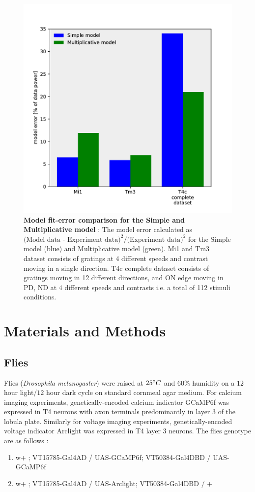 \documentclass[9pt,lineno]{elife}
\begin{document}
\begin{figure}
\begin{fullwidth}
\includegraphics[width=0.84\linewidth]{figure10}
\caption{\textbf{Model fit-error comparison for the Simple and Multiplicative model} : The model error calculated as $\text{(Model data - Experiment data)}^2 / \text{(Experiment data)}^2$ for the Simple model (blue) and Multiplicative model (green). Mi1 and Tm3 dataset consists of gratings at 4 different speeds and contrast moving in a single direction. T4c complete dataset consists of gratings moving in 12 different directions, and ON edge moving in PD, ND at 4 different speeds and contrasts i.e. a total of 112 stimuli conditions.}

\label{FitError}
	
\end{fullwidth}
\end{figure} 




\section{Materials and Methods}
\subsection{Flies}
Flies (\textit{Drosophila melanogaster}) were raised at $25\degree C$ and $60\%$ humidity on a $12$ hour light/$12$ hour dark cycle on standard cornmeal agar medium. For calcium imaging experiments, genetically-encoded calcium indicator GCaMP6f \parencite{Chen2013} was expressed in T4 neurons with axon terminals predominantly in  layer 3 of the lobula plate. Similarly for voltage imaging experiments, genetically-encoded voltage indicator Arclight \parencite{Jin2012} was expressed in T4 layer 3 neurons. The flies genotype are as follows : 
\begin{enumerate}
\item w+ ; VT15785-Gal4AD / UAS-GCaMP6f; VT50384-Gal4DBD / UAS-GCaMP6f 
\item w+ ; VT15785-Gal4AD / UAS-Arclight; VT50384-Gal4DBD / + 
\end{enumerate}
\end{document}
